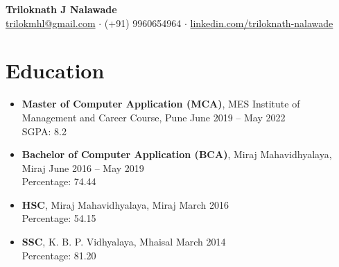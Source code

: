 \documentclass[letterpaper,11pt]{article}
\begin{document}
\begin{center}
    \textbf{\Huge Triloknath J Nalawade}\\
    \vspace{0.05in}
    \href{mailto:trilokmhl@gmail.com}{trilokmhl@gmail.com} $\cdot$ (+91) 9960654964 $\cdot$ \href{https://linkedin.com/in/triloknath-nalawade/}{linkedin.com/triloknath-nalawade}
\end{center}

\section*{Education}
\begin{itemize}[leftmargin=*]
    \item \textbf{Master of Computer Application (MCA)}, MES Institute of Management and Career Course, Pune \hfill June 2019 -- May 2022 \\
    SGPA: 8.2
    \item \textbf{Bachelor of Computer Application (BCA)}, Miraj Mahavidhyalaya, Miraj \hfill June 2016 -- May 2019 \\
    Percentage: 74.44%
     \item \textbf{HSC}, Miraj Mahavidhyalaya, Miraj \hfill March 2016 \\
    Percentage: 54.15%
    \item \textbf{SSC}, K. B. P. Vidhyalaya, Mhaisal \hfill March 2014 \\
    Percentage: 81.20%
\end{itemize}

\end{document}
